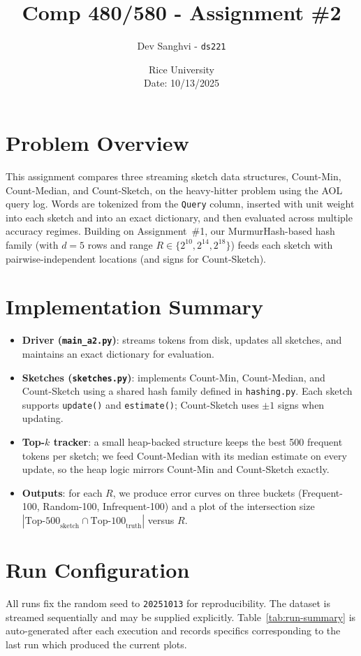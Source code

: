 \documentclass[11pt]{article}
\title{Comp 480/580 - Assignment \#2}
\author{Dev Sanghvi - \texttt{ds221}}
\date{Rice University \\ Date: 10/13/2025}
\begin{document}
\maketitle

\section*{Problem Overview}
This assignment compares three streaming sketch data structures, Count-Min, Count-Median, and Count-Sketch, on the heavy-hitter problem using the AOL query log. Words are tokenized from the \texttt{Query} column, inserted with unit weight into each sketch and into an exact dictionary, and then evaluated across multiple accuracy regimes. Building on Assignment~\#1, our MurmurHash-based hash family (with $d=5$ rows and range $R\in\{2^{10},2^{14},2^{18}\}$) feeds each sketch with pairwise-independent locations (and signs for Count-Sketch).

\section{Implementation Summary}
\begin{itemize}
  \item \textbf{Driver (\texttt{main\_a2.py})}: streams tokens from disk, updates all sketches, and maintains an exact dictionary for evaluation.
  \item \textbf{Sketches (\texttt{sketches.py})}: implements Count-Min, Count-Median, and Count-Sketch using a shared hash family defined in \texttt{hashing.py}. Each sketch supports \texttt{update()} and \texttt{estimate()}; Count-Sketch uses $\pm1$ signs when updating.
  \item \textbf{Top-$k$ tracker}: a small heap-backed structure keeps the best 500 frequent tokens per sketch; we feed Count-Median with its median estimate on every update, so the heap logic mirrors Count-Min and Count-Sketch exactly.
  \item \textbf{Outputs}: for each $R$, we produce error curves on three buckets (Frequent-100, Random-100, Infrequent-100) and a plot of the intersection size $|\text{Top-500}_\text{sketch}\cap\text{Top-100}_\text{truth}|$ versus $R$.
\end{itemize}

\section{Run Configuration}
All runs fix the random seed to \texttt{20251013} for reproducibility. The dataset is streamed sequentially and may be supplied explicitly.  Table~\ref{tab:run-summary} is auto-generated after each execution and records specifics corresponding to the last run which produced the current plots.
\end{document}
